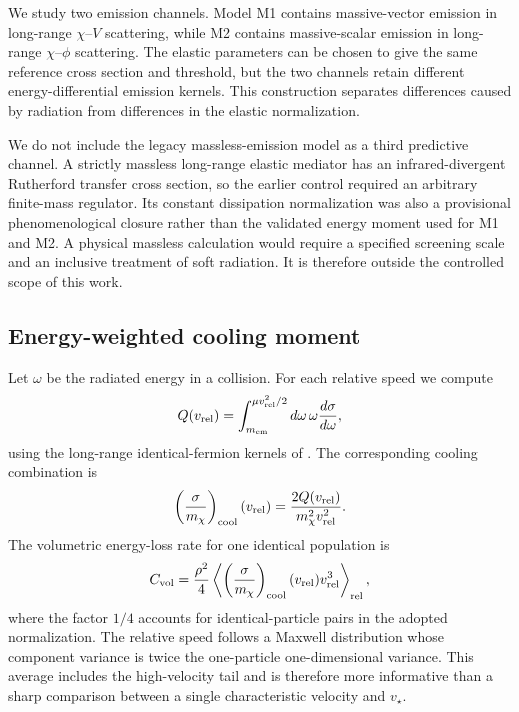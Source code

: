 \documentclass[12pt]{article}
\newcommand{\vrel}{v_{\rm rel}}
\newcommand{\vstar}{v_\star}
\begin{document}
We study two emission channels.  Model M1 contains massive-vector emission in
long-range $\chi$--$V$ scattering, while M2 contains massive-scalar emission
in long-range $\chi$--$\phi$ scattering.  The elastic parameters can be chosen
to give the same reference cross section and threshold, but the two channels
retain different energy-differential emission kernels.  This construction
separates differences caused by radiation from differences in the elastic
normalization.

We do not include the legacy massless-emission model as a third predictive
channel.  A strictly massless long-range elastic mediator has an
infrared-divergent Rutherford transfer cross section, so the earlier control
required an arbitrary finite-mass regulator.  Its constant dissipation
normalization was also a provisional phenomenological closure rather than the
validated energy moment used for M1 and M2.  A physical massless calculation
would require a specified screening scale and an inclusive treatment of soft
radiation.  It is therefore outside the controlled scope of this work.

\subsection{Energy-weighted cooling moment}

Let $\omega$ be the radiated energy in a collision.  For each relative speed
we compute
\begin{equation}
  Q(\vrel)=\int_{m_{\rm em}}^{\mu\vrel^2/2}
  d\omega\,\omega\frac{d\sigma}{d\omega},
  \label{eq:q-moment}
\end{equation}
using the long-range identical-fermion kernels of
\citet{LankesterBroche2026}.  The corresponding cooling combination is
\begin{equation}
  \left(\frac{\sigma}{m_\chi}\right)_{\rm cool}(\vrel)
  =\frac{2Q(\vrel)}{m_\chi^2\vrel^2}.
  \label{eq:sigma-cooling}
\end{equation}
The volumetric energy-loss rate for one identical population is
\begin{equation}
  C_{\rm vol}=\frac{\rho^2}{4}
  \left\langle
  \left(\frac{\sigma}{m_\chi}\right)_{\rm cool}(\vrel)
  \vrel^3
  \right\rangle_{\rm rel},
  \label{eq:cooling-moment}
\end{equation}
where the factor $1/4$ accounts for identical-particle pairs in the adopted
normalization.  The relative speed follows a Maxwell distribution whose
component variance is twice the one-particle one-dimensional variance.  This
average includes the high-velocity tail and is therefore more informative
than a sharp comparison between a single characteristic velocity and
$\vstar$.
\end{document}

